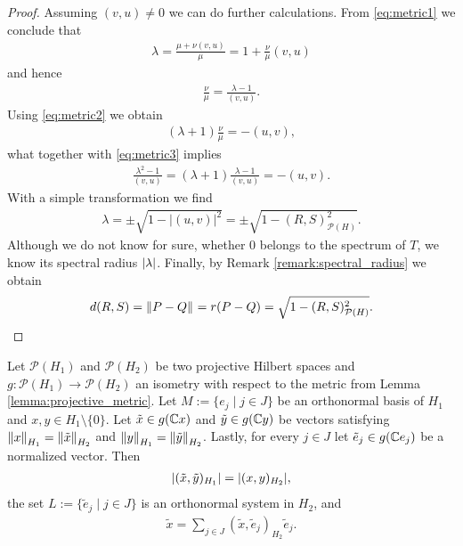 \begin{proof}
	Assuming $(v,u) \neq 0$ we can do further calculations. From \eqref{eq:metric1} we conclude that
	\begin{align*}
		\lambda = \frac{\mu + \nu (v,u)}{\mu} = 1 + \frac{\nu}{\mu} (v,u) 
	\end{align*}
	and hence
	\begin{align}
		\frac{\nu}{\mu} = \frac{\lambda - 1}{(v,u)}. \label{eq:metric3}
	\end{align}
	Using \eqref{eq:metric2} we obtain
	\begin{align*}
		 (\lambda + 1) \frac{\nu}{\mu} =  -(u,v), 
	\end{align*}
	what together with \eqref{eq:metric3} implies
	\begin{align*}
			\frac{\lambda^2 - 1}{(v,u)} = (\lambda + 1) \frac{\lambda - 1}{(v,u)} =  - (u,v).
	\end{align*}
	With a simple transformation we find
	\begin{align*}
		\lambda = \pm \sqrt{1 - |(u,v)|^2} = \pm \sqrt{1 - (R,S)_{\mathcal{P}(H)}^2}.
	\end{align*}
	Although we do not know for sure, whether $0$ belongs to the spectrum of $T$, we know its spectral radius $\vbraces{\lambda}$. Finally, by Remark \ref{remark:spectral_radius} we obtain
	\begin{align*}
		d(R,S) = \norm{P - Q} = r(P - Q) = \sqrt{1 - (R,S)_{\mathcal{P}(H)}^2}.
	\end{align*}
\end{proof}


\begin{lemma}
	Let $\mathcal{P}(H_1)$ and $\mathcal{P}(H_2)$ be two projective Hilbert spaces and $g: \mathcal{P}(H_1) \to \mathcal{P}(H_2)$ an isometry with respect to the metric from Lemma \ref{lemma:projective_metric}. Let $M := \{e_j \mid j \in J\}$ be an orthonormal basis of $H_1$ and $x,y \in H_1 \setminus \{0\} $. Let $\tilde{x} \in g(\C x)$ and $\tilde{y} \in g(\C y)$  be vectors satisfying $\norm[H_1]{x} = \norm[H_2]{\tilde{x}}$ and $\norm[H_1]{y} = \norm[H_2]{\tilde{y}}$. Lastly, for every $j \in J$ let $\tilde{e}_j \in g(\C e_j)$ be a normalized vector. Then
	\begin{align} 
		\vbraces{(\tilde{x}, \tilde{y})_{H_1}} = \vbraces{(x, y)_{H_2}} \label{eq:vector_isometry},
	\end{align}
	the set $L:=\{\tilde{e}_j \mid j \in J\}$ is an orthonormal system in $H_2$, and 
	\begin{align}
	\tilde{x} = \sum_{j \in J} (\tilde{x}, \tilde{e}_j)_{H_2} \tilde{e}_j. \label{eq:ran_fourier}
	\end{align} 
\end{lemma}

